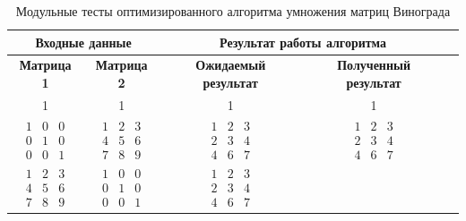 \begin{table}[ht]
	\small
	\begin{center}
		\begin{threeparttable}
			\caption{Модульные тесты оптимизированного алгоритма умножения матриц Винограда}
			\label{tests:optWinograd}
			\begin{tabular}{|c|c|c|c|c|}
				\hline
				\multicolumn{2}{|c|}{\bfseries Входные данные}
				& \multicolumn{2}{c|}{\bfseries Результат работы алгоритма} \\
				\hline 
				\bfseries Матрица 1
				& \bfseries Матрица 2
				& \bfseries Ожидаемый результат
				& \bfseries Полученный результат \\
				\hline
				1 & 1 & 1 & 1 \\ 
				\hline
				$\begin{matrix}
					1 & 0 & 0\\
					0 & 1 & 0\\
					0 & 0 & 1
				\end{matrix}$ 
				&  
				$\begin{matrix}
					1 & 2 & 3\\
					4 & 5 & 6\\
					7 & 8 & 9
				\end{matrix}$ 
				&
				$\begin{matrix}
					1 & 2 & 3\\
					2 & 3 & 4\\
					4 & 6 & 7
				\end{matrix}$ 
				&
				$\begin{matrix}
					1 & 2 & 3\\
					2 & 3 & 4\\
					4 & 6 & 7
				\end{matrix}$  \\ 
				\hline
				$\begin{matrix}
					1 & 2 & 3\\
					4 & 5 & 6\\
					7 & 8 & 9
				\end{matrix}$ 
				&
				$\begin{matrix}
					1 & 0 & 0\\
					0 & 1 & 0\\
					0 & 0 & 1
				\end{matrix}$ 
				&  
				$\begin{matrix}
					1 & 2 & 3\\
					2 & 3 & 4\\
					4 & 6 & 7
				\end{matrix}$ 

\end{tabular}
\end{threeparttable}
\end{center}
\end{table}

